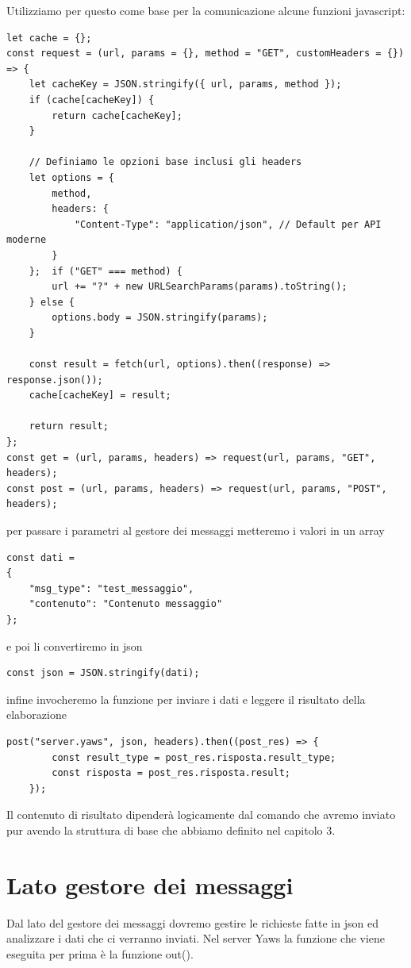 Utilizziamo per questo come base per la comunicazione alcune funzioni javascript:
\begin{verbatim}
let cache = {};
const request = (url, params = {}, method = "GET", customHeaders = {}) => {
    let cacheKey = JSON.stringify({ url, params, method });
    if (cache[cacheKey]) {
        return cache[cacheKey];
    }
    
    // Definiamo le opzioni base inclusi gli headers
    let options = {
        method,
        headers: {
            "Content-Type": "application/json", // Default per API moderne
        }
    };  if ("GET" === method) {
        url += "?" + new URLSearchParams(params).toString();
    } else {
        options.body = JSON.stringify(params);
    }
    
    const result = fetch(url, options).then((response) => response.json());
    cache[cacheKey] = result;
    
    return result;
};
const get = (url, params, headers) => request(url, params, "GET", headers);
const post = (url, params, headers) => request(url, params, "POST", headers);

\end{verbatim}

per passare i parametri al gestore dei messaggi metteremo i valori in un array

\begin{verbatim}
const dati = 
{ 
    "msg_type": "test_messaggio", 
    "contenuto": "Contenuto messaggio" 
};
\end{verbatim}
e poi li convertiremo in json
\begin{verbatim}
const json = JSON.stringify(dati);
\end{verbatim}
infine invocheremo la funzione per inviare i dati e leggere il risultato della elaborazione
\begin{verbatim}
post("server.yaws", json, headers).then((post_res) => {
        const result_type = post_res.risposta.result_type;
        const risposta = post_res.risposta.result;
    }); 
\end{verbatim}
Il contenuto di risultato dipender\`a logicamente dal comando che avremo inviato pur avendo la struttura di base che abbiamo definito nel capitolo 3.

\section{Lato gestore dei messaggi}
Dal lato del gestore dei messaggi dovremo gestire le richieste fatte in json ed analizzare i dati che ci verranno inviati.
Nel server Yaws la funzione che viene eseguita per prima \`e la funzione out().

